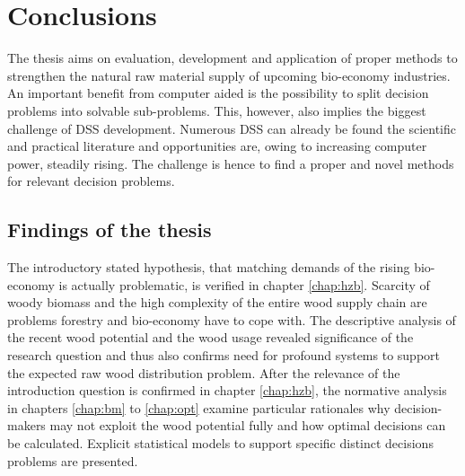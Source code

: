 \chapter{Conclusions}
\label{chap:discussion}
\newpage
\noindent
The thesis aims on evaluation, development and application of proper methods to strengthen the natural raw material supply of upcoming bio-economy industries. An important benefit from computer aided is the possibility to split decision problems into solvable sub-problems. This, however, also implies the biggest challenge of DSS development. Numerous DSS can already be found the scientific and practical literature and opportunities are, owing to increasing computer power, steadily rising. The challenge is hence to find a proper and novel methods for relevant decision problems.

\section{Findings of the thesis}
\label{sec:discussion:findings}
The introductory stated hypothesis, that matching demands of the rising bio-economy is actually problematic, is verified in chapter \ref{chap:hzb}. Scarcity of woody biomass and the high complexity of the entire wood supply chain are problems forestry and bio-economy have to cope with. The descriptive analysis of the recent wood potential and the wood usage revealed significance of the research question and thus also confirms need for profound systems to support the expected raw wood distribution problem. After the relevance of the introduction question is confirmed in chapter \ref{chap:hzb}, the normative analysis in chapters \ref{chap:bm} to \ref{chap:opt} examine particular rationales why decision-makers may not exploit the wood potential fully and how optimal decisions can be calculated. Explicit statistical models to support specific distinct decisions problems are presented.

